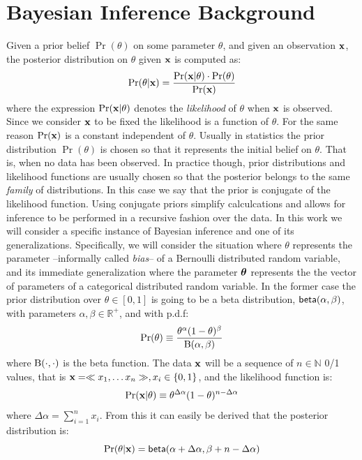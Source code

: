 \documentclass[sigconf, anonymous]{acmart}
\begin{document}
% 

\section{Bayesian Inference Background}
\label{sec_background}
Given a prior belief $\Pr(\theta)$ on some parameter $\theta$,
and given an observation $\textbf{x}$,
the posterior distribution on $\theta$ given $\textbf{x}$ is computed as:
\[
  \Pr(\theta | \textbf{x}) = \frac{\Pr(\textbf{x} | \theta) \cdot \Pr(\theta)}{\Pr(\textbf{x})}
\]
where the expression  $\Pr(\textbf{x} | \theta)$ denotes the \emph{likelihood} of $\theta$ when
$\textbf{x}$ is observed. Since we consider $\textbf{x}$ to be fixed the likelihood is a function of $\theta$.
For the same reason $\Pr(\textbf{x})$ is a constant independent of $\theta$.
Usually in statistics the prior distribution $\Pr(\theta)$ is chosen so that it represents
the initial belief on $\theta$. That is, when no data has been observed. In practice though,
prior distributions and likelihood functions are usually chosen so that the posterior
belongs to the same \emph{family} of distributions. In this case we say that the prior
is conjugate of the likelihood function. Using conjugate priors simplify calculcations and allows
for inference to be performed in a recursive fashion over the data.
In this work we will consider a specific instance of Bayesian inference and one of its generalizations.
Specifically, we will consider the situation where $\theta$ represents the parameter --informally called \emph{bias}--
of a Bernoulli distributed random variable, and its immediate generalization where the parameter $\boldsymbol{\theta}$ represents
the the vector of parameters of a categorical distributed random variable.
In the former case the prior distribution over $\theta\in [0,1]$ is going to be a beta distribution, $\mathsf{beta}(\alpha, \beta)$, with parameters
$\alpha,\beta\in\mathbb{R}^{+}$, and with p.d.f:
\[
  \Pr(\theta)\equiv \frac{\theta^{\alpha} (1- \theta)^{\beta}}{\textup{B}(\alpha,\beta)}
\]
where $\textup{B}(\cdot,\cdot)$ is the beta function.
The data $\textbf{x}$ will be a sequence of $n\in\mathbb{N}$ 0/1 values, that is $\textbf{x}=\ll x_1,\dots x_n \gg, x_i\in\{0,1\}$, and the likelihood function is:
\[
  \Pr(\textbf{x} | \theta)\equiv \theta^{\Delta \alpha}(1-\theta)^{n - \Delta \alpha}
\]
where $\Delta \alpha = \displaystyle\sum_{i=1}^{n}x_i$.
From this it can easily be derived that the posterior distribution is:
\[
  \Pr(\theta|\textbf{x})=\mathsf{beta}(\alpha + \Delta \alpha,\beta + n - \Delta \alpha)
\]
\end{document}
